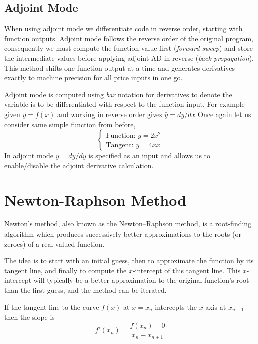 \documentclass[12pt,a4paper]{book}
\begin{document}
\subsection{Adjoint Mode}
When using adjoint mode we differentiate code in reverse order, starting with function outputs. 
Adjoint mode follows the reverse order of the original program, consequently we must compute the function value first (\emph{forward sweep}) and store the intermediate values before applying adjoint AD in reverse (\emph{back propagation}). This method shifts one function output at a time and generates derivatives exactly to machine precision for all price inputs in one go.

Adjoint mode is computed using \emph{bar} notation for derivatives to denote the variable is to be differentiated with respect to the function input. For example given $y = f(x)$ and working in reverse order gives $\bar{y} = dy/dx$
Once again let us consider same simple function from before,
\begin{equation}
\begin{cases}
\text{Function: } y = 2x^2\\
\text{Tangent: } \bar{y} = 4x\bar{x}
\end{cases}
\end{equation}
In adjoint mode $\bar{y} = dy/dy$ is specified as an input and allows us to enable/disable the adjoint derivative calculation. 

\section{Newton-Raphson Method}
Newton's method, also known as the Newton–Raphson method, is a root-finding algorithm which produces successively better approximations to the roots (or zeroes) of a real-valued function. %

The idea is to start with an initial guess, then to approximate the function by its tangent line, and finally to compute the $x$-intercept of this tangent line. This $x$-intercept will typically be a better approximation to the original function's root than the first guess, and the method can be iterated.

If the tangent line to the curve $f(x)$ at $x = x_n$ intercepts the $x$-axis at $x_{n+1}$ then the slope is
\begin{equation}
	f'(x_n)=\dfrac {f(x_{n})-0}{x_{n}-x_{n+1}}
\end{equation}
\end{document}

